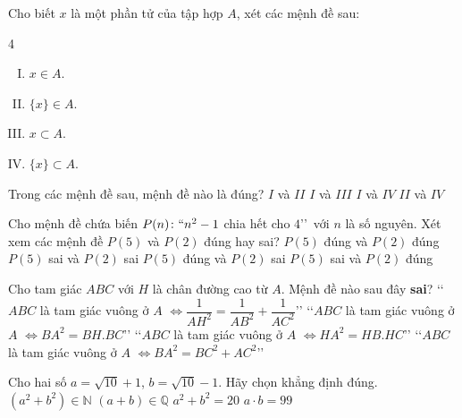 \begin{ex}%
	Cho biết $x$ là một phần tử của tập hợp $A$, xét các mệnh đề sau:
	\begin{multicols}{4}
		\begin{enumerate}[(I).] 
			\item $x\in A$.
			\item $\{x\}\in A$.
			\item $x\subset A$.
			\item $\{x\}\subset A$.
		\end{enumerate}
	\end{multicols}
	Trong các mệnh đề sau, mệnh đề nào là đúng?
	\choice
	{$I$ và $II$}
	{$I$ và $III$}
	{\True $I$ và $IV$}
	{$II$ và $IV$}
\end{ex}
\begin{ex}%
	Cho mệnh đề chứa biến $P(n)\colon \lq\lq n^2-1$ chia hết cho $4$\rq\rq\, với $n$ là số nguyên. Xét xem các mệnh đề $P(5)$ và $P(2)$ đúng hay sai?
	\choice
	{$P(5)$ đúng và $P(2)$ đúng}
	{$P(5)$ sai và $P(2)$ sai}
	{\True $P(5)$ đúng và $P(2)$ sai}
	{$P(5)$ sai và $P(2)$ đúng}
\end{ex}
\begin{ex}%
	Cho tam giác $ABC$ với $H$ là chân đường cao từ $A$. Mệnh đề nào sau đây {\bf sai}?
	\choice
	{\lq\lq $ABC$ là tam giác vuông ở $A$ $\Leftrightarrow \dfrac{1}{AH^2}=\dfrac{1}{AB^2}+\dfrac{1}{AC^2}$\rq\rq}
	{\lq\lq $ABC$ là tam giác vuông ở $A$ $\Leftrightarrow BA^2=BH.BC$\rq\rq}
	{\lq\lq $ABC$ là tam giác vuông ở $A$ $\Leftrightarrow HA^2=HB.HC$\rq\rq}
	{\True \lq\lq $ABC$ là tam giác vuông ở $A$ $\Leftrightarrow BA^2=BC^2+AC^2$\rq\rq}
\end{ex}
\begin{ex}%
	Cho hai số $a=\sqrt{10}+1$, $b=\sqrt{10}-1$. Hãy chọn khẳng định đúng.
	\choice
	{\True $\left(a^2+b^2 \right)\in \mathbb{N}$}
	{\True $\left(a+b\right)\in \mathbb{Q}$}
	{\True $a^2+b^2=20$}
	{\True $a\cdot b=99$}
\end{ex}
